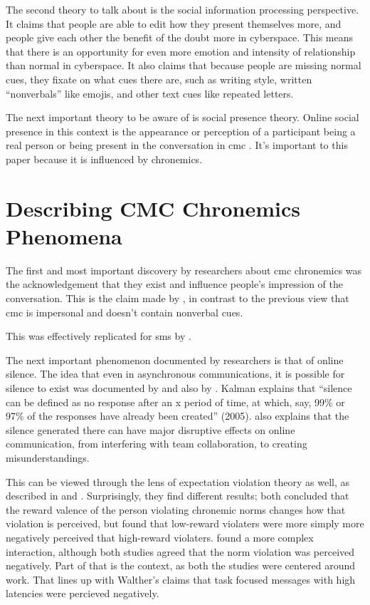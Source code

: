 \documentclass[
  stu]{apa7}
\begin{document}
The second theory to talk about is the social information processing
perspective. It claims that people are able to edit how they present
themselves more, and people give each other the benefit of the doubt
more in cyberspace. This means that there is an opportunity for even
more emotion and intensity of relationship than normal in cyberspace. It
also claims that because people are missing normal cues, they fixate on
what cues there are, such as writing style, written ``nonverbals'' like
emojis, and other text cues like repeated letters.

The next important theory to be aware of is social presence theory.
Online social presence in this context is the appearance or perception
of a participant being a real person or being present in the
conversation in cmc \autocite{cui13}. It's important to this paper
because it is influenced by chronemics.

\hypertarget{describing-cmc-chronemics-phenomena}{%
\section{Describing CMC Chronemics
Phenomena}\label{describing-cmc-chronemics-phenomena}}

The first and most important discovery by researchers about cmc
chronemics was the acknowledgement that they exist and influence
people's impression of the conversation. This is the claim made by
\textcite{walther95}, in contrast to the previous view that cmc is
impersonal and doesn't contain nonverbal cues.

This was effectively replicated for sms by \textcite{doring09}.

The next important phenomenon documented by researchers is that of
online silence. The idea that even in asynchronous communications, it is
possible for silence to exist was documented by \textcite{ravid} and
also by \textcite{kalman05}. Kalman explains that ``silence can be
defined as no response after an x period of time, at which, say, 99\% or
97\% of the responses have already been created'' (2005).
\textcite{kalman05} also explains that the silence generated there can
have major disruptive effects on online communication, from interfering
with team collaboration, to creating misunderstandings.

This can be viewed through the lens of expectation violation theory as
well, as described in \textcite{kalman11} and \textcite{sheldon06}.
Surprisingly, they find different results; both concluded that the
reward valence of the person violating chronemic norms changes how that
violation is perceived, but \textcite{sheldon06} found that low-reward
violaters were more simply more negatively perceived that high-reward
violaters. \textcite{kalman11} found a more complex interaction,
although both studies agreed that the norm violation was perceived
negatively. Part of that is the context, as both the studies were
centered around work. That lines up with Walther's claims that task
focused messages with high latencies were percieved negatively.
\end{document}
